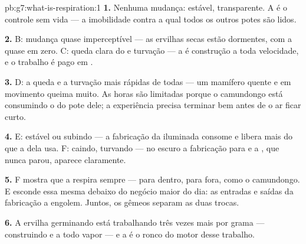\begin{solution}{pb:g7:what-is-respiration:1}
\textbf{1.} Nenhuma mudança:  estável, 
transparente. A é o controle sem vida --- a imobilidade contra a qual
todos os outros potes são lidos.

\textbf{2.} B: mudança quase imperceptível --- as ervilhas secas estão
dormentes, com a  quase em zero. C: queda clara do 
e turvação --- a  é construção a toda velocidade, e o
trabalho é pago em .

\textbf{3.} D: a queda e a turvação mais rápidas de todas --- um
mamífero quente e em movimento queima muito. As horas são limitadas
porque o camundongo está consumindo o  do pote dele; a
experiência precisa terminar bem antes de o ar ficar curto.

\textbf{4.} E:  estável ou subindo --- a fabricação da 
iluminada consome  e libera mais  do que a
 dela usa. F:  caindo,  turvando --- no
escuro a fabricação para e a , que nunca parou, aparece
claramente.

\textbf{5.} F mostra que a  respira sempre ---  para
dentro,  para fora, como o camundongo. E esconde essa
mesma  debaixo do negócio maior do dia: as entradas e saídas
da fabricação a engolem. Juntos, os gêmeos separam as duas trocas.

\textbf{6.} A ervilha germinando está trabalhando três vezes mais por
grama --- construindo  e  a todo vapor --- e a  é o
ronco do motor desse trabalho.


\end{solution}
